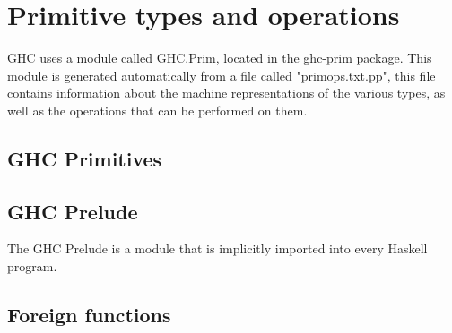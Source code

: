 

\chapter{Primitive types and operations}

GHC uses a module called GHC.Prim, located in the ghc-prim package. This
module is generated automatically from a file called "primops.txt.pp", this file
contains information about the machine representations of the various types, as
well as the operations that can be performed on them.

\section*{GHC Primitives}

\section*{GHC Prelude}

The GHC Prelude is a module that is implicitly imported into every Haskell program.

\section*{Foreign functions}


